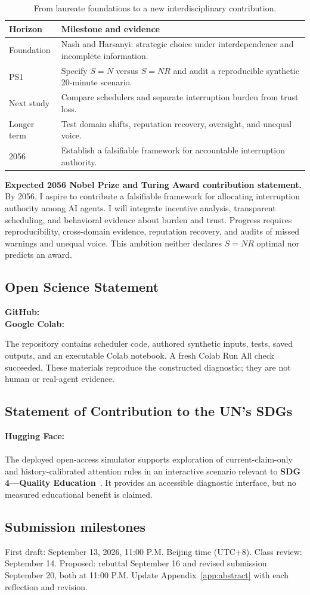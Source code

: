 \begin{table}[h]\caption{From laureate foundations to a new interdisciplinary contribution.}
\begin{tabularx}{\columnwidth}{@{}p{1.6cm}Y@{}}\toprule
\textbf{Horizon}&\textbf{Milestone and evidence}\\\midrule
Foundation&Nash and Harsanyi: strategic choice under interdependence and incomplete information.\\
PS1&Specify $S=N$ versus $S=NR$ and audit a reproducible synthetic 20-minute scenario.\\
Next study&Compare schedulers and separate interruption burden from trust loss.\\
Longer term&Test domain shifts, reputation recovery, oversight, and unequal voice.\\
2056&Establish a falsifiable framework for accountable interruption authority.\\\bottomrule
\end{tabularx}\end{table}

\noindent\textbf{Expected 2056 Nobel Prize and Turing Award contribution statement.}
By 2056, I aspire to contribute a falsifiable framework for allocating interruption authority among AI agents. I will integrate incentive analysis, transparent scheduling, and behavioral evidence about burden and trust. Progress requires reproducibility, cross-domain evidence, reputation recovery, and audits of missed warnings and unequal voice. This ambition neither declares $S=NR$ optimal nor predicts an award.

\subsection*{Open Science Statement}
\textbf{GitHub:} \GitHubLink\\
\textbf{Google Colab:} \ColabLink\par
The repository contains scheduler code, authored synthetic inputs, tests, saved outputs, and an executable Colab notebook. A fresh Colab Run All check succeeded. These materials reproduce the constructed diagnostic; they are not human or real-agent evidence.

\subsection*{Statement of Contribution to the UN's SDGs}
\textbf{Hugging Face:}\\
\DemoLink\\
The deployed open-access simulator supports exploration of current-claim-only and history-calibrated attention rules in an interactive scenario relevant to \textbf{SDG 4---Quality Education}~\cite{sdg4}. It provides an accessible diagnostic interface, but no measured educational benefit is claimed.

\subsection*{Submission milestones}
First draft: September 13, 2026, 11:00 P.M. Beijing time (UTC+8). Class review: September 14. Proposed: rebuttal September 16 and revised submission September 20, both at 11:00 P.M. Update Appendix~\ref{app:abstract} with each reflection and revision.
